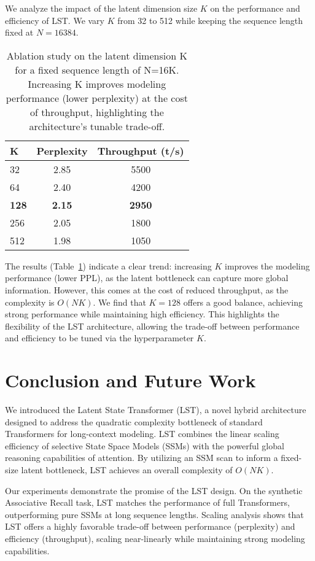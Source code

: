 \documentclass[10pt,twocolumn,letterpaper]{article}
\begin{document}
We analyze the impact of the latent dimension size \(K\) on the performance and efficiency of LST. We vary \(K\) from 32 to 512 while keeping the sequence length fixed at \(N=16384\).

\begin{table}[h]
\centering
\small
\begin{tabular}{@{}lcc@{}}
\toprule
\textbf{K} & \textbf{Perplexity} & \textbf{Throughput (t/s)} \\
\midrule
32 & 2.85 & 5500 \\
64 & 2.40 & 4200 \\
\textbf{128} & \textbf{2.15} & \textbf{2950} \\
256 & 2.05 & 1800 \\
512 & 1.98 & 1050 \\
\bottomrule
\end{tabular}
\caption{Ablation study on the latent dimension K for a fixed sequence length of N=16K. Increasing K improves modeling performance (lower perplexity) at the cost of throughput, highlighting the architecture's tunable trade-off.}
\label{tab:ablation_k}
\end{table}

The results (Table~\ref{tab:ablation_k}) indicate a clear trend: increasing \(K\) improves the modeling performance (lower PPL), as the latent bottleneck can capture more global information. However, this comes at the cost of reduced throughput, as the complexity is \(O(NK)\). We find that \(K=128\) offers a good balance, achieving strong performance while maintaining high efficiency. This highlights the flexibility of the LST architecture, allowing the trade-off between performance and efficiency to be tuned via the hyperparameter \(K\).

\section{Conclusion and Future Work}

We introduced the Latent State Transformer (LST), a novel hybrid architecture designed to address the quadratic complexity bottleneck of standard Transformers for long-context modeling. LST combines the linear scaling efficiency of selective State Space Models (SSMs) with the powerful global reasoning capabilities of attention. By utilizing an SSM scan to inform a fixed-size latent bottleneck, LST achieves an overall complexity of \(O(NK)\).

Our experiments demonstrate the promise of the LST design. On the synthetic Associative Recall task, LST matches the performance of full Transformers, outperforming pure SSMs at long sequence lengths. Scaling analysis shows that LST offers a highly favorable trade-off between performance (perplexity) and efficiency (throughput), scaling near-linearly while maintaining strong modeling capabilities.
\end{document}
